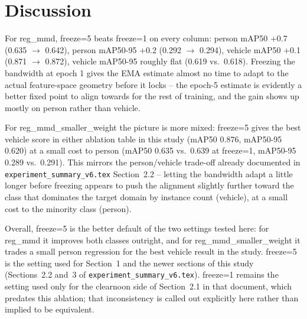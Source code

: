 \documentclass[11pt]{article}
\begin{document}
\section{Discussion}

For reg\_mmd, freeze=5 beats freeze=1 on every column: person mAP50 +0.7
(0.635 $\to$ 0.642), person mAP50-95 +0.2 (0.292 $\to$ 0.294), vehicle mAP50 +0.1
(0.871 $\to$ 0.872), vehicle mAP50-95 roughly flat (0.619 vs.\ 0.618). Freezing the
bandwidth at epoch 1 gives the EMA estimate almost no time to adapt to the actual
feature-space geometry before it locks -- the epoch-5 estimate is evidently a better
fixed point to align towards for the rest of training, and the gain shows up mostly
on person rather than vehicle.

For reg\_mmd\_smaller\_weight the picture is more mixed: freeze=5 gives the best
vehicle score in either ablation table in this study (mAP50 0.876, mAP50-95 0.620)
at a small cost to person (mAP50 0.635 vs.\ 0.639 at freeze=1, mAP50-95 0.289 vs.\
0.291). This mirrors the person/vehicle trade-off already documented in
\texttt{experiment\_summary\_v6.tex} Section~2.2 -- letting the bandwidth adapt a
little longer before freezing appears to push the alignment slightly further toward
the class that dominates the target domain by instance count (vehicle), at a small
cost to the minority class (person).

Overall, freeze=5 is the better default of the two settings tested here: for reg\_mmd
it improves both classes outright, and for reg\_mmd\_smaller\_weight it trades a
small person regression for the best vehicle result in the study. freeze=5 is the
setting used for Section~1 and the newer sections of this study (Sections~2.2
and~3 of \texttt{experiment\_summary\_v6.tex}). freeze=1 remains the setting used
only for the clearnoon side of Section~2.1 in that document, which predates this
ablation; that inconsistency is called out explicitly here rather than implied to
be equivalent.
\end{document}
